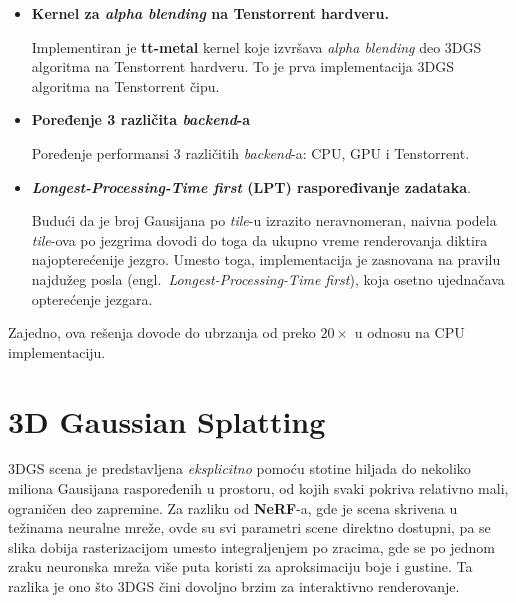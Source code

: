 \documentclass[12pt]{article}
\begin{document}
   \begin{itemize}
      \item \textbf{Kernel za \textit{alpha blending} na Tenstorrent hardveru.}
            
            Implementiran je \textbf{tt-metal} kernel koje izvršava \textit{alpha blending} deo 3DGS algoritma
            na Tenstorrent hardveru. To je prva implementacija 3DGS algoritma na Tenstorrent čipu.
      
      \item \textbf{Poređenje 3 različita \textit{backend}-a}
            
            Poređenje performansi 3 različitih \textit{backend}-a: CPU, GPU i Tenstorrent.

      \newpage
      \item \textbf{\textit{Longest-Processing-Time first} (LPT) raspoređivanje zadataka}.
            
         Budući da je broj Gausijana po \textit{tile}-u izrazito neravnomeran, naivna
         podela \textit{tile}-ova po jezgrima dovodi do toga da ukupno vreme renderovanja
         diktira najopterećenije jezgro. Umesto toga, implementacija je 
         zasnovana na pravilu najdužeg posla (engl.\ \textit{Longest-Processing-Time
         first}), koja osetno ujednačava opterećenje jezgara.
   \end{itemize}

   Zajedno, ova rešenja dovode do ubrzanja od preko $20\times$ u odnosu na CPU implementaciju.

   \newpage
   \section{3D Gaussian Splatting}

   3DGS scena je predstavljena \emph{eksplicitno} pomoću stotine hiljada
   do nekoliko miliona Gausijana raspoređenih u prostoru, od kojih svaki pokriva
   relativno mali, ograničen deo zapremine. Za razliku od \textbf{NeRF}-a, gde je scena
   skrivena u težinama neuralne mreže, ovde su svi parametri scene direktno
   dostupni, pa se slika dobija rasterizacijom umesto integraljenjem po zracima, gde se po jednom
   zraku neuronska mreža više puta koristi za aproksimaciju boje i gustine.
   Ta razlika je ono što 3DGS čini dovoljno brzim za interaktivno renderovanje.
\end{document}
